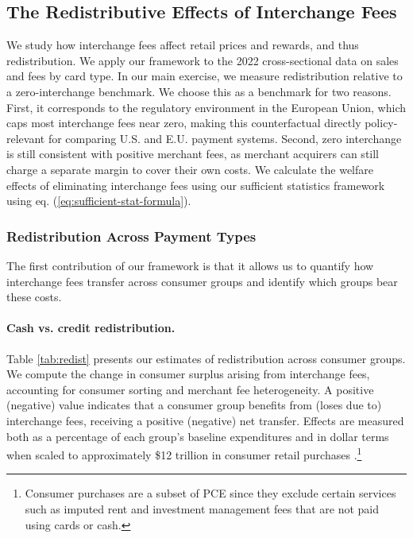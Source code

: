 \documentclass[11pt,english]{article}
\theoremstyle{remark}
\begin{document}
\subsection{The Redistributive Effects of Interchange Fees\label{subsec:eliminate-interchange}}

We study how interchange fees affect retail prices and rewards, and thus redistribution. 
We apply our framework to the 2022 cross-sectional data on sales and fees by card type.
In our main exercise, we measure redistribution relative to a zero-interchange benchmark.
We choose this as a benchmark for two reasons.
First, it corresponds to the regulatory environment in the European Union, which caps most interchange fees near zero, making this counterfactual directly policy-relevant for comparing U.S. and E.U. payment systems.
Second, zero interchange is still consistent with positive merchant fees, as merchant acquirers can still charge a separate margin to cover their own costs. We calculate the welfare effects of eliminating interchange fees using our sufficient statistics framework using eq. (\ref{eq:sufficient-stat-formula}).








\subsubsection{Redistribution Across Payment Types}

The first contribution of our framework is that it allows us to quantify how interchange fees transfer across consumer groups and identify which groups bear these costs.

\paragraph{Cash vs. credit redistribution.}

Table \ref{tab:redist} presents our estimates of redistribution across consumer groups.
We compute the change in consumer surplus arising from interchange fees, accounting for consumer sorting and merchant fee heterogeneity. A positive (negative) value indicates that a consumer group benefits from (loses due to) interchange fees, receiving a positive (negative) net transfer.
Effects are measured both as a percentage of each group's baseline expenditures and in dollar terms when scaled to approximately \$12 trillion in consumer retail purchases \citep{Nilson2023a}.\footnote{Consumer purchases are a subset of PCE since they exclude certain services such as imputed rent and investment management fees that are not paid using cards or cash.}
\end{document}
